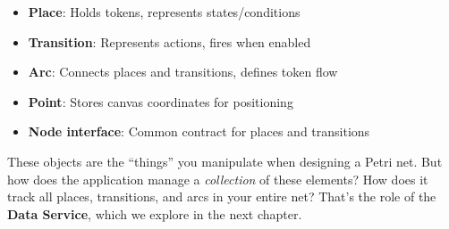 \begin{itemize}
    \item \textbf{Place}: Holds tokens, represents states/conditions
    \item \textbf{Transition}: Represents actions, fires when enabled
    \item \textbf{Arc}: Connects places and transitions, defines token flow
    \item \textbf{Point}: Stores canvas coordinates for positioning
    \item \textbf{Node interface}: Common contract for places and transitions
\end{itemize}

These objects are the ``things'' you manipulate when designing a Petri net. But how does the application manage a \textit{collection} of these elements? How does it track all places, transitions, and arcs in your entire net? That's the role of the \textbf{Data Service}, which we explore in the next chapter.
